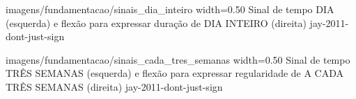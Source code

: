 \begin{enumerate}
        {imagens/fundamentacao/sinais_dia_inteiro} %
        {width=0.50\linewidth} %
        {Sinal de tempo DIA (esquerda) e flexão para expressar duração de DIA INTEIRO (direita)} %
        {jay-2011-dont-just-sign} %

        {imagens/fundamentacao/sinais_cada_tres_semanas} %
        {width=0.50\linewidth} %
        {Sinal de tempo TRÊS SEMANAS (esquerda) e flexão para expressar regularidade de A CADA TRÊS SEMANAS (direita)} %
        {jay-2011-dont-just-sign} %

\end{enumerate}










